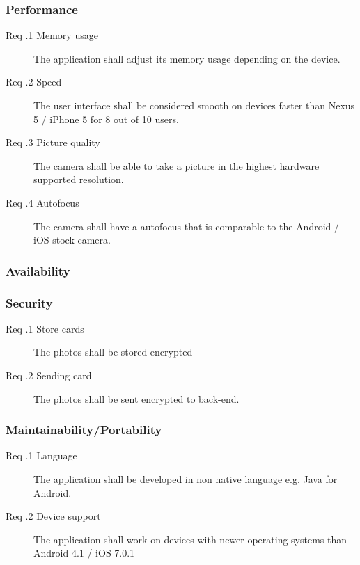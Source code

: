 \newcommand{\tsss}{\thesubsubsection}
\subsubsection{Performance}
\begin{description}
	\item[Req \tsss.1 Memory usage] The application shall adjust its memory usage depending on the device.
	\item[Req \tsss.2 Speed] The user interface shall be considered smooth on devices faster than Nexus 5 / iPhone 5 for 8 out of 10 users. 
	\item[Req \tsss.3 Picture quality] The camera shall be able to take a picture in the highest hardware supported resolution. 
	\item[Req \tsss.4 Autofocus] The camera shall have a autofocus that is comparable to the Android / iOS stock camera. 
\end{description}
\subsubsection{Availability}
\subsubsection{Security}
\begin{description}
	\item[Req \tsss.1 Store cards] The photos shall be stored encrypted
	\item[Req \tsss.2 Sending card] The photos shall be sent encrypted to back-end.
\end{description}
\subsubsection{Maintainability/Portability}
\begin{description}
	\item[Req \tsss.1 Language] The application shall be developed in non native language e.g. Java for Android. 
	\item[Req \tsss.2 Device support] The application shall work on devices with newer operating systems than Android 4.1 / iOS 7.0.1
\end{description}

